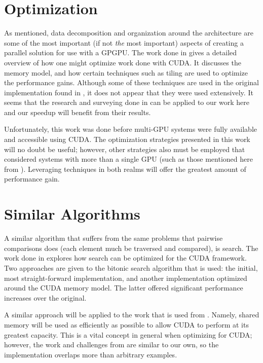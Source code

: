 \documentclass[12pt]{ucthesis}
\begin{document}
\section{Optimization}
\label{sec:opti}
As mentioned, data decomposition and organization around the architecture are
some of the most important (if not \emph{the} most important) aspects of
creating a parallel solution for use with a GPGPU. The work done in
\cite{ryoo2008optimization} gives a detailed overview of how one might optimize
work done with CUDA. It discusses the memory model, and how certain techniques
such as tiling are used to optimize the performance gains. Although some of
these techniques are used in the original implementation found in
\cite{scharfglass2012breaking}, it does not appear that they were used extensively.
It seems that the research and surveying done in \cite{ryoo2008optimization}
can be applied to our work here and our speedup will benefit from their results.

Unfortunately, this work was done before multi-GPU systems were fully available
and accessible using CUDA. The optimization strategies presented in this work
will no doubt be useful; however, other strategies also must be employed that
considered systems with more than a single GPU (such as those mentioned here
from \cite{thibault2009cuda}). Leveraging techniques in both realms will offer
the greatest amount of performance gain.

\section{Similar Algorithms}
\label{sec:simialg}
A similar algorithm that suffers from the same problems that pairwise
comparisons does (each element much be traversed and compared), is search. The
work done in \cite{peters2011fast} explores how search can be optimized for the
CUDA framework. Two approaches are given to the bitonic search algorithm that
is used: the initial, most straight-forward implementation, and another
implementation optimized around the CUDA memory model. The latter offered
significant performance increases over the original. 

A similar approach will be applied to the work that is used from
\cite{scharfglass2012breaking}. Namely, shared memory will be used as efficiently
as possible to allow CUDA to perform at its greatest capacity. This is a vital
concept in general when optimizing for CUDA; however, the work and challenges
from \cite{peters2011fast} are similar to our own, so the implementation
overlaps more than arbitrary examples.
\end{document}
